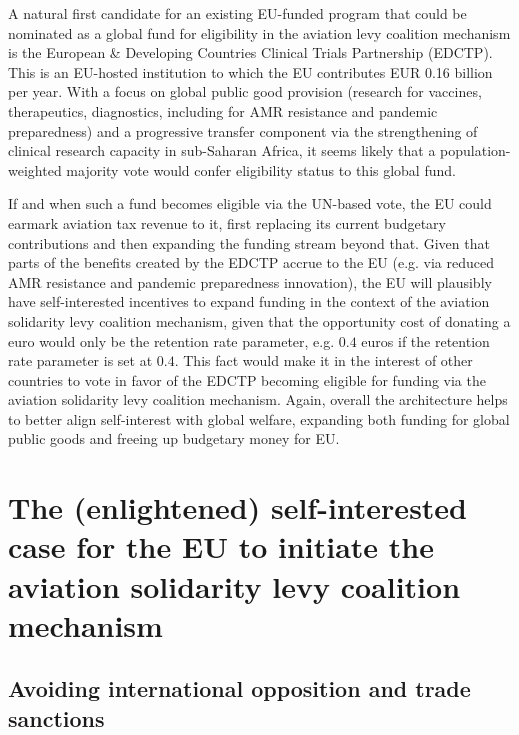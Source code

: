 A natural first candidate for an existing EU-funded program that could be nominated as a global fund for eligibility in the aviation levy coalition mechanism is the European \& Developing Countries Clinical Trials Partnership (EDCTP). This is an EU-hosted institution to which the EU contributes EUR 0.16 billion per year. With a focus on global public good provision (research for vaccines, therapeutics, diagnostics, including for AMR resistance and pandemic preparedness) and a progressive transfer component via the strengthening of clinical research capacity in sub-Saharan Africa, it seems likely that a population-weighted majority vote would confer eligibility status to this global fund.

If and when such a fund becomes eligible via the UN-based vote, the EU could earmark aviation tax revenue to it, first replacing its current budgetary contributions and then expanding the funding stream beyond that. Given that parts of the benefits created by the EDCTP accrue to the EU (e.g. via reduced AMR resistance and pandemic preparedness innovation), the EU will plausibly have self-interested incentives to expand funding in the context of the aviation solidarity levy coalition mechanism, given that the opportunity cost of donating a euro would only be the retention rate parameter, e.g. $0.4$ euros if the retention rate parameter is set at $0.4$. This fact would make it in the interest of other countries to vote in favor of the EDCTP becoming eligible for funding via the aviation solidarity levy coalition mechanism. Again, overall the architecture helps to better align self-interest with global welfare, expanding both funding for global public goods and freeing up budgetary money for EU.


\section{The (enlightened) self-interested case for the EU to initiate the aviation solidarity levy coalition mechanism }

\subsection{Avoiding international opposition and trade sanctions}

